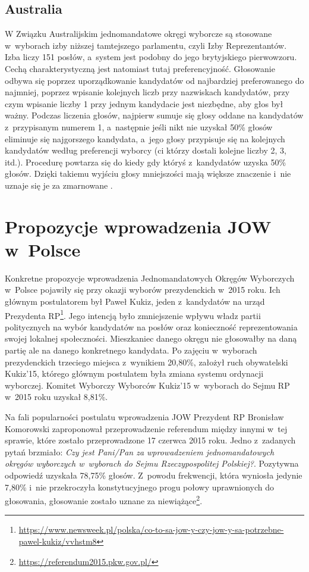 \subsection{Australia}
W Związku Australijskim jednomandatowe okręgi wyborcze są stosowane w~wyborach izby niższej tamtejszego parlamentu, czyli Izby Reprezentantów. Izba liczy 151 posłów, a~system jest podobny do jego brytyjskiego pierwowzoru. Cechą charakterystyczną jest natomiast tutaj preferencyjność. Głosowanie odbywa się poprzez uporządkowanie kandydatów od najbardziej preferowanego do najmniej, poprzez wpisanie kolejnych liczb przy nazwiskach kandydatów, przy czym wpisanie liczby 1 przy jednym kandydacie jest niezbędne, aby głos był ważny. Podczas liczenia głosów, najpierw sumuje się głosy oddane na kandydatów z~przypisanym numerem 1, a~następnie jeśli nikt nie uzyskał 50\% głosów eliminuje się najgorszego kandydata, a~jego głosy przypisuje się na kolejnych kandydatów według preferencji wyborcy (ci którzy dostali kolejne liczby 2, 3, itd.). Procedurę powtarza się do kiedy gdy któryś z~kandydatów uzyska 50\% głosów. Dzięki takiemu wyjściu głosy mniejszości mają większe znaczenie i~nie uznaje się je za zmarnowane \cite{Urbańczyk}.

\section{Propozycje wprowadzenia JOW w~Polsce}

Konkretne propozycje wprowadzenia Jednomandatowych Okręgów Wyborczych w~Polsce pojawiły się przy okazji wyborów prezydenckich w~2015 roku. Ich głównym postulatorem był Paweł Kukiz, jeden z~kandydatów na urząd Prezydenta RP\footnote{\url{https://www.newsweek.pl/polska/co-to-sa-jow-y-czy-jow-y-sa-potrzebne-pawel-kukiz/vvhstm8}}. Jego intencją było zmniejszenie wpływu władz partii politycznych na wybór kandydatów na posłów oraz konieczność reprezentowania swojej lokalnej społeczności. Mieszkaniec danego okręgu nie głosowałby na daną partię ale na danego konkretnego kandydata. Po zajęciu w~wyborach prezydenckich trzeciego miejsca z~wynikiem 20,80\%, założył ruch obywatelski Kukiz'15, którego głównym postulatem była zmiana systemu ordynacji wyborczej. Komitet Wyborczy Wyborców Kukiz'15 w~wyborach do Sejmu RP w~2015 roku uzyskał 8,81\%.

Na fali popularności postulatu wprowadzenia JOW Prezydent RP Bronisław Komorowski zaproponował przeprowadzenie referendum między innymi w~tej sprawie, które zostało przeprowadzone 17 czerwca 2015 roku. Jedno z~zadanych pytań brzmiało: \textit{Czy jest Pani/Pan za wprowadzeniem jednomandatowych okręgów wyborczych w~wyborach do Sejmu Rzeczypospolitej Polskiej?}. Pozytywna odpowiedź uzyskała 78,75\% głosów. Z~powodu frekwencji, która wyniosła jedynie 7,80\% i~nie przekroczyła konstytucyjnego progu połowy uprawnionych do głosowania, głosowanie zostało uznane za niewiążące\footnote{\url{https://referendum2015.pkw.gov.pl/}}.

